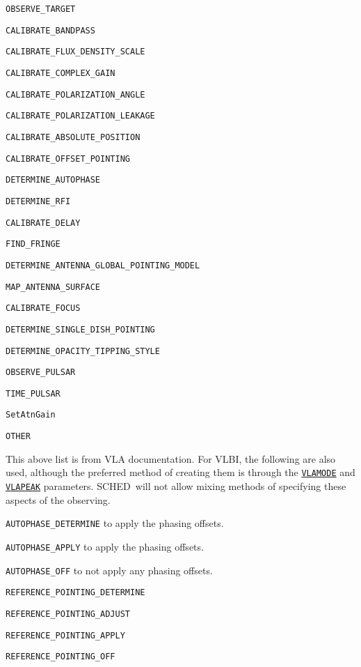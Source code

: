 \documentclass{report}
\newcommand{\schedb}{{\sc SCHED~}}
\begin{document}
\begin{list}{}{\parsep 0em  \itemsep 0em }
\item {\tt OBSERVE\_TARGET}
\item {\tt CALIBRATE\_BANDPASS}
\item {\tt CALIBRATE\_FLUX\_DENSITY\_SCALE} 
\item {\tt CALIBRATE\_COMPLEX\_GAIN}
\item {\tt CALIBRATE\_POLARIZATION\_ANGLE}
\item {\tt CALIBRATE\_POLARIZATION\_LEAKAGE}
\item {\tt CALIBRATE\_ABSOLUTE\_POSITION}
\item {\tt CALIBRATE\_OFFSET\_POINTING}
\item {\tt DETERMINE\_AUTOPHASE}
\item {\tt DETERMINE\_RFI}
\item {\tt CALIBRATE\_DELAY}
\item {\tt FIND\_FRINGE}
\item {\tt DETERMINE\_ANTENNA\_GLOBAL\_POINTING\_MODEL}
\item {\tt MAP\_ANTENNA\_SURFACE}
\item {\tt CALIBRATE\_FOCUS}
\item {\tt DETERMINE\_SINGLE\_DISH\_POINTING}
\item {\tt DETERMINE\_OPACITY\_TIPPING\_STYLE}
\item {\tt OBSERVE\_PULSAR}
\item {\tt TIME\_PULSAR}
\item {\tt SetAtnGain}
\item {\tt OTHER}
\end{list}

This above list is from VLA documentation.  For VLBI, the following
are also used, although the preferred method of creating them is
through the 
{\hyperref[MP:VLAMODE]{{\tt VLAMODE}}} and 
{\hyperref[MP:VLAPEAK]{{\tt VLAPEAK}}} parameters.  \schedb will not
allow mixing methods of specifying these aspects of the observing.

\begin{list}{}{\parsep 0em  \itemsep 0em }
\item {\tt AUTOPHASE\_DETERMINE} to apply the phasing offsets.
\item {\tt AUTOPHASE\_APPLY} to apply the phasing offsets.
\item {\tt AUTOPHASE\_OFF} to not apply any phasing offsets.
\item {\tt REFERENCE\_POINTING\_DETERMINE}
\item {\tt REFERENCE\_POINTING\_ADJUST}
\item {\tt REFERENCE\_POINTING\_APPLY}
\item {\tt REFERENCE\_POINTING\_OFF}
\end{list}
\end{document}
